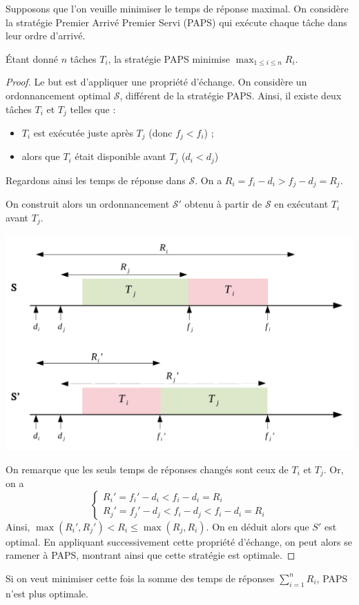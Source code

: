 Supposons que l'on veuille minimiser le temps de réponse maximal. On considère la stratégie \og Premier Arrivé Premier Servi \fg{} (PAPS) qui exécute chaque tâche dans leur ordre d'arrivé. 

\begin{theorem}
Étant donné $n$ tâches $T_i$, la stratégie PAPS minimise $\max_{1\leq i \leq n} R_i $.
\end{theorem}

\begin{proof}
Le but est d'appliquer une propriété d'échange. On considère un ordonnancement optimal $\mathcal{S}$, différent de la stratégie PAPS.  Ainsi, il existe deux tâches $T_i$ et $T_j$ telles que :
\begin{itemize}
\item $T_i$ est exécutée juste après $T_j$ (donc $f_j <f_i$) ;
\item alors que $T_i$ était disponible avant $T_j$ ($d_i <d_j$)
\end{itemize}
Regardons ainsi les temps de réponse dans $\mathcal{S}$. On a $R_i = f_i -d_i > f_j - d_j = R_j$. \newline

On construit alors un ordonnancement $\mathcal{S}'$ obtenu à partir de $\mathcal{S}$ en exécutant $T_i$ avant $T_j$. 


\begin{center}
\includegraphics[scale=0.5]{Developpements/Ordonnancement online/ordo 2.pdf}
\end{center}

On remarque que les seuls temps de réponses changés sont ceux de $T_i$ et $T_j$. Or, on a 
$$
\left\lbrace \begin{array}{l}
R_i' = f_i'-d_i <f_i-d_i = R_i \\
R_j' = f_j' - d_j <f_i-d_j < f_i-d_i=R_i
\end{array}\right.
$$
Ainsi,  $\max(R_i',R_j') <R_i \leq \max(R_j,R_i)$. On en déduit alors que $S'$ est optimal. En appliquant successivement cette propriété d'échange, on peut alors se ramener à PAPS, montrant ainsi que cette stratégie est optimale.
\end{proof}

\begin{rem}
Si on veut minimiser cette fois la somme des temps de réponses $\sum_{i=1}^n R_i$, PAPS n'est plus optimale.
\end{rem}